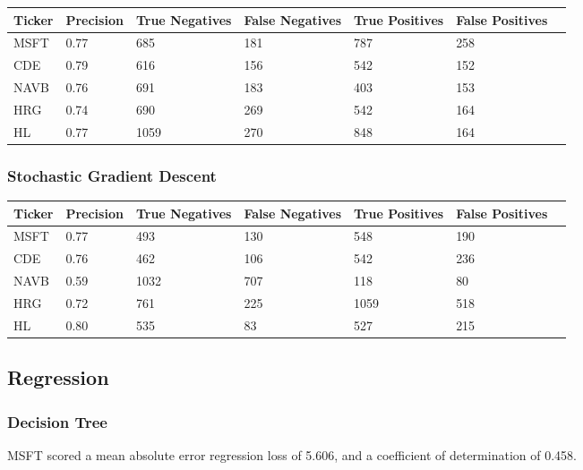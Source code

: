 \begin{center}
    \begin{tabular}{ | l | l | l | | l | l | l | p{5cm} |}
    \hline
    Ticker & Precision & True Negatives & False Negatives & True Positives & False Positives \\ \hline
    MSFT & 0.77 & 685 & 181 & 787 & 258 \\ \hline
    CDE & 0.79 & 616 & 156 & 542 & 152 \\ \hline
    NAVB & 0.76 & 691 & 183 & 403 & 153 \\ \hline
    HRG & 0.74 & 690 & 269 & 542 & 164 \\ \hline
    HL & 0.77 & 1059 & 270 & 848 & 164 \\
    \hline
    \end{tabular}
    \label{table:nonfloat}
\end{center}

\subsubsection{Stochastic Gradient Descent}

\begin{center}
    \begin{tabular}{ | l | l | l | | l | l | l | p{5cm} |}
    \hline
    Ticker & Precision & True Negatives & False Negatives & True Positives & False Positives \\ \hline
    MSFT & 0.77 & 493 & 130 & 548 & 190 \\ \hline
    CDE & 0.76 & 462 & 106 & 542 & 236 \\ \hline
    NAVB & 0.59 & 1032 & 707 & 118 & 80 \\ \hline
    HRG & 0.72 & 761 & 225 & 1059 & 518 \\ \hline
    HL & 0.80 & 535 & 83 & 527 & 215 \\
    \hline
    \end{tabular}
    \label{table:nonfloat}
\end{center}

\subsection{Regression}

\subsubsection{Decision Tree}
MSFT scored a mean absolute error regression loss of 5.606, and a coefficient of determination of 0.458.

